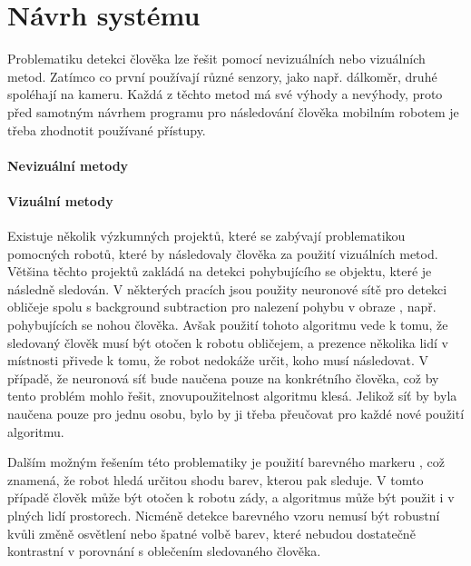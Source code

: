 \documentclass[twoside]{ctuthesis}
\theoremstyle{plain}
\theoremstyle{definition}
\theoremstyle{note}
\begin{document}
\chapter{Návrh systému}


Problematiku detekci člověka lze řešit pomocí nevizuálních nebo vizuálních metod. Zatímco co první používají různé senzory, jako např. dálkoměr, druhé spoléhají na kameru. Každá z těchto metod má své výhody a nevýhody, proto před samotným návrhem programu pro následování člověka mobilním robotem je třeba zhodnotit používané přístupy.

\subsubsection{Nevizuální metody} 

\subsubsection{Vizuální metody}

Existuje několik výzkumných projektů, které se zabývají problematikou pomocných robotů, které by následovaly člověka za použití vizuálních metod. Většina těchto projektů zakládá na detekci pohybujícího se objektu, které je následně sledován. V některých pracích jsou použity neuronové sítě pro detekci obličeje spolu s background subtraction pro nalezení pohybu v obraze \cite{cite:19}, např. pohybujících se nohou člověka. Avšak použití tohoto algoritmu vede k tomu, že sledovaný člověk musí být otočen k robotu obličejem, a prezence několika lidí v místnosti přivede k tomu, že robot nedokáže určit, koho musí následovat. V případě, že neuronová síť bude naučena pouze na konkrétního člověka, což by tento problém mohlo řešit, znovupoužitelnost algoritmu klesá. Jelikož síť by byla naučena pouze pro jednu osobu, bylo by ji třeba přeučovat pro každé nové použití algoritmu.

Dalším možným řešením této problematiky je použití barevného markeru \cite{cite:18}, což znamená, že robot hledá určitou shodu barev, kterou pak sleduje. V tomto případě člověk může být otočen k robotu zády, a algoritmus může být použit i v plných lidí prostorech. Nicméně detekce barevného vzoru nemusí být robustní kvůli změně osvětlení nebo špatné volbě barev, které nebudou dostatečně kontrastní v porovnání s oblečením sledovaného člověka.
\end{document}
